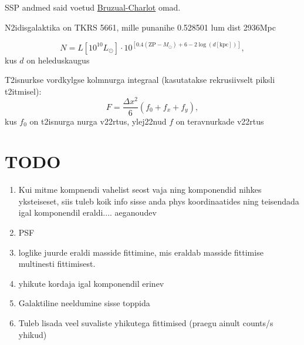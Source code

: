 \documentclass{article}
\begin{document}
	SSP andmed said voetud \href{http://www.bruzual.org/bc03/Updated_version_2016/}{Bruzual-Charlot} omad.
	
	N2idisgalaktika on TKRS 5661, mille punanihe 0.528501 lum dist 2936Mpc
	
	\begin{equation}
		N = L\left[ 10^{10}L_\odot \right] \cdot 10^{\left[ 0.4(\mathrm{ZP}-M_\odot) +6 - 2\log(d[\mathrm{kpc}]) \right]},
	\end{equation}
	kus $d$ on heleduskaugus
	
	T2isnurkse vordkylgse kolmnurga integraal (kasutatakse rekrusiivselt piksli t2itmisel):
	\begin{equation}
		F = \frac{\Delta x^2}{6}(f_0+f_x+f_y),
	\end{equation}
	kus $f_0$ on t2isnurga nurga v22rtus, ylej22nud $f$ on teravnurkade v22rtus
	
	\section{TODO} %
	\label{sec:todo}
	\begin{enumerate}
		\item Kui mitme kompnendi vahelist seost vaja ning komponendid nihkes yksteiseset, siis tuleb koik info sisse anda phys koordinaatides ning teisendada igal komponendil eraldi.... aeganoudev
		\item PSF
		\item loglike juurde eraldi masside fittimine, mis eraldab masside fittimise multinesti fittimisest.
		\item yhikute kordaja igal komponendil erinev
		\item Galaktiline neeldumine sisse toppida
		\item Tuleb lisada veel suvaliste yhikutega fittimised (praegu ainult counts/s yhikud)
	\end{enumerate}
\end{document}
